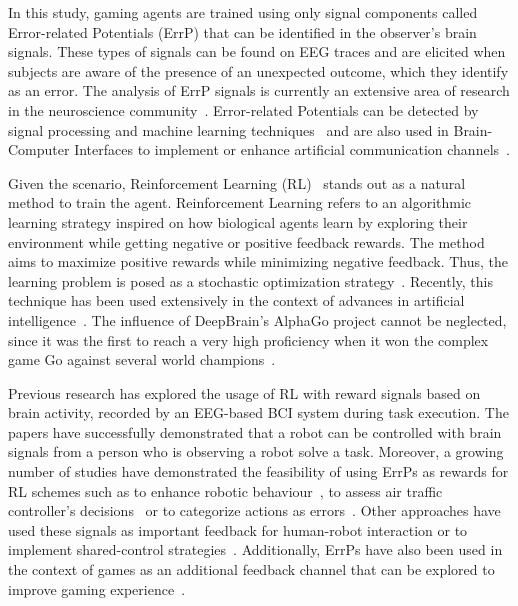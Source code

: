 \documentclass[journal]{IEEEtran}
\begin{document}
In this study, gaming agents are trained using only signal components called Error-related Potentials (ErrP) that can be identified in the observer's brain signals.  These types of signals can be found on EEG traces and are elicited when subjects are aware of the presence of an unexpected outcome, which they identify as an error.  The analysis of ErrP signals is currently an extensive area of research in the neuroscience community~\cite{Holroyd2009}. Error-related Potentials can be detected by signal processing and machine learning techniques~\cite{EERP-PAPER} and are also used in Brain-Computer Interfaces to implement or enhance artificial communication channels~\cite{Chavarriaga2014}.

Given the scenario, Reinforcement Learning (RL)~\cite{Sutton2018} stands out as a natural method to train the agent.  Reinforcement Learning refers to an algorithmic learning strategy inspired on how biological agents learn by exploring their environment while getting negative or positive feedback rewards.  The method aims to maximize positive rewards while minimizing negative feedback.  Thus, the learning problem is posed as a stochastic optimization strategy~\cite{Santos1999}.  Recently, this technique has been used extensively in the context of advances in artificial intelligence~\cite{Nguyen2020}. The influence of DeepBrain's AlphaGo project cannot be neglected, since it was the first to reach a very high proficiency when it won the complex game Go against several world champions~\cite{ALPHA-GO}.


Previous research has explored the usage of RL with reward signals based on brain activity, recorded by an EEG-based BCI system during task execution. The papers \cite{ROBOT-CONTROL-PAPER,Kim2017,Omedes2013} have successfully demonstrated that a robot can be controlled with brain signals from a person who is observing a robot solve a task.  Moreover, a growing number of studies have demonstrated the feasibility of using ErrPs as rewards for RL schemes such as to enhance robotic behaviour~\cite{Luo2019}, to assess air traffic controller's decisions~\cite{Goh2019} or to categorize actions as errors~\cite{Wirth2020}. Other approaches have used these signals as important feedback for human-robot interaction or to implement shared-control strategies~\cite{Schiatti2018}.  Additionally, ErrPs have also been used in the context of games as an additional feedback channel that can be explored to improve gaming experience~\cite{Plass-OudeBos2010,kober2018bci}.
\end{document}
